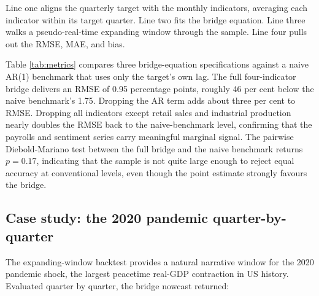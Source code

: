 Line one aligns the quarterly target with the monthly indicators,
averaging each indicator within its target quarter. Line two fits the
bridge equation. Line three walks a pseudo-real-time expanding window
through the sample. Line four pulls out the RMSE, MAE, and bias.

Table \ref{tab:metrics} compares three bridge-equation specifications
against a naive AR(1) benchmark that uses only the target's own lag. The
full four-indicator bridge delivers an RMSE of 0.95 percentage points,
roughly 46 per cent below the naive benchmark's 1.75. Dropping the AR
term adds about three per cent to RMSE. Dropping all indicators except
retail sales and industrial production nearly doubles the RMSE back to
the naive-benchmark level, confirming that the payrolls and sentiment
series carry meaningful marginal signal. The pairwise Diebold-Mariano
test between the full bridge and the naive benchmark returns
\(p = 0.17\), indicating that the sample is not quite large enough to
reject equal accuracy at conventional levels, even though the point
estimate strongly favours the bridge.

\begin{table}[!htbp]
\centering
\caption{\textbf{Backtest metrics for three bridge-equation specifications on US real GDP growth.} Expanding window, first evaluation at quarter forty, 2012-present evaluation sample. Adding the AR(1) term marginally reduces RMSE; dropping two of the four indicators modestly widens it.}
\label{tab:metrics}

\end{table}

\subsection{Case study: the 2020 pandemic
quarter-by-quarter}\label{case-study-the-2020-pandemic-quarter-by-quarter}

The expanding-window backtest provides a natural narrative window for
the 2020 pandemic shock, the largest peacetime real-GDP contraction in
US history. Evaluated quarter by quarter, the bridge nowcast returned:

